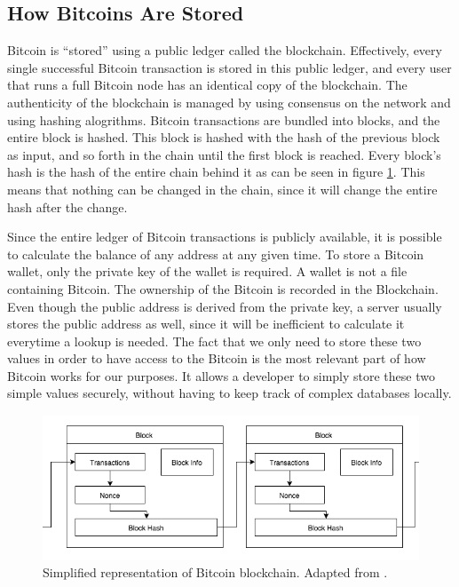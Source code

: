 \subsection{How Bitcoins Are Stored}
\label{sbs:bitcoin_stored}

Bitcoin is ``stored'' using a public ledger called the blockchain. Effectively, every single successful Bitcoin transaction is stored in this public ledger, and every user that runs a full Bitcoin node has an identical copy of the blockchain. The authenticity of the blockchain is managed by using consensus on the network and using hashing alogrithms. Bitcoin transactions are bundled into blocks, and the entire block is hashed. This block is hashed with the hash of the previous block as input, and so forth in the chain until the first block is reached. Every block's hash is the hash of the entire chain behind it as can be seen in figure \ref{fig:Blockchain}. This means that nothing can be changed in the chain, since it will change the entire hash after the change.

Since the entire ledger of Bitcoin transactions is publicly available, it is possible to calculate the balance of any address at any given time. To store a Bitcoin wallet, only the private key of the wallet is required. A wallet is not a file containing Bitcoin. The ownership of the Bitcoin is recorded in the Blockchain. Even though the public address is derived from the private key, a server usually stores the public address as well, since it will be inefficient to calculate it everytime a lookup is needed. The fact that we only need to store these two values in order to have access to the Bitcoin is the most relevant part of how Bitcoin works for our purposes. It allows a developer to simply store these two simple values securely, without having to keep track of complex databases locally.

\begin{figure}
  \centering
  	\caption{Simplified representation of Bitcoin blockchain. Adapted from \cite{Nakamoto2008}.} 
    \includegraphics[width=\textwidth]{figs/Blockchain.png}
   
   \label{fig:Blockchain}
\end{figure}

